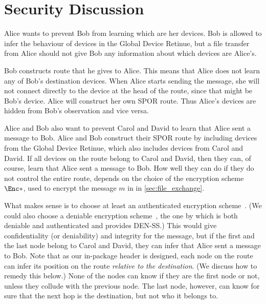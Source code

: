 \section{Security Discussion}%
\label{SecurityDiscussion}

Alice wants to prevent Bob from learning which are her devices.
Bob is allowed to infer the behaviour of devices in the Global Device Retinue, 
but a file transfer from Alice should not give Bob any information about which 
devices are Alice's.

Bob constructs  route that he gives to Alice.
This means that Alice does not learn any of Bob's destination devices.
When Alice starts sending the message, she will not connect directly to the 
device at the head of the route, since that might be Bob's device.
Alice will construct her own \ac{SPOR} route.
Thus Alice's devices are hidden from Bob's observation and vice versa.

Alice and Bob also want to prevent Carol and David to learn that Alice sent a 
message to Bob.
Alice and Bob construct their \ac{SPOR} route by including devices from the 
Global Device Retinue, which also includes devices from Carol and David.
If all devices on the route belong to Carol and David, then they can, of course, 
learn that Alice sent a message to Bob.
How well they can do if they do not control the entire route, depends on the 
choice of the encryption scheme \(\Enc*\), used to encrypt the message \(m\) in 
in \cref{sec:file_exchange}.

What makes sense is to choose at least an authenticated encryption 
scheme~\cite{AuthEncryption}.
(We could also choose a deniable encryption scheme~\cite{DeniableEncryption}, 
\eg the one by \textcite{OTPKX} which is both deniable and authenticated and 
provides \ac{DEN-SS}.)
This would give confidentiality (or deniability) and integrity for the message, 
but if the first and the last node belong to Carol and David, they can infer 
that Alice sent a message to Bob.
Note that as our in-package header is designed, each node on the route can infer 
its position on the route \emph{relative to the destination}.
(We discuss how to remedy this below.)
None of the nodes can know if they are the first node or not, unless they 
collude with the previous node.
The last node, however, can know for sure that the next hop is the destination, 
but not who it belongs to.

